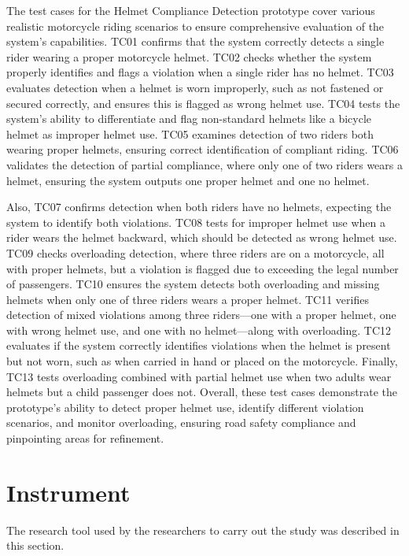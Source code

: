 \begin{refsection}
\noindent

The test cases for the Helmet Compliance Detection prototype cover various realistic motorcycle riding scenarios to ensure comprehensive evaluation of the system’s capabilities. TC01 confirms that the system correctly detects a single rider wearing a proper motorcycle helmet. TC02 checks whether the system properly identifies and flags a violation when a single rider has no helmet. TC03 evaluates detection when a helmet is worn improperly, such as not fastened or secured correctly, and ensures this is flagged as wrong helmet use. TC04 tests the system’s ability to differentiate and flag non-standard helmets like a bicycle helmet as improper helmet use. TC05 examines detection of two riders both wearing proper helmets, ensuring correct identification of compliant riding. TC06 validates the detection of partial compliance, where only one of two riders wears a helmet, ensuring the system outputs one proper helmet and one no helmet. 

Also, TC07 confirms detection when both riders have no helmets, expecting the system to identify both violations. TC08 tests for improper helmet use when a rider wears the helmet backward, which should be detected as wrong helmet use. TC09 checks overloading detection, where three riders are on a motorcycle, all with proper helmets, but a violation is flagged due to exceeding the legal number of passengers. TC10 ensures the system detects both overloading and missing helmets when only one of three riders wears a proper helmet. TC11 verifies detection of mixed violations among three riders—one with a proper helmet, one with wrong helmet use, and one with no helmet—along with overloading. TC12 evaluates if the system correctly identifies violations when the helmet is present but not worn, such as when carried in hand or placed on the motorcycle. Finally, TC13 tests overloading combined with partial helmet use when two adults wear helmets but a child passenger does not. Overall, these test cases demonstrate the prototype’s ability to detect proper helmet use, identify different violation scenarios, and monitor overloading, ensuring road safety compliance and pinpointing areas for refinement.


\section*{Instrument}


    The research tool used by the researchers to carry out the study was described in this section.



\end{refsection}
